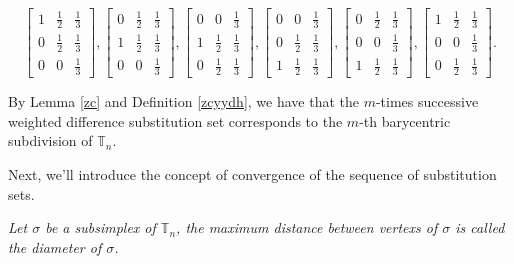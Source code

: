 \documentclass [10pt,a4paper]{article}
\begin{document}
\begin{displaymath}
\left[
\begin{array}{lll}
1 & \frac{1}{2} & \frac{1}{3} \\
0 & \frac{1}{2} & \frac{1}{3} \\
0 & 0 & \frac{1}{3}
\end{array} \right],
 \left[
\begin{array}{lll}
0 & \frac{1}{2} & \frac{1}{3} \\
1& \frac{1}{2} & \frac{1}{3} \\
0 & 0 & \frac{1}{3}
\end{array} \right],\left[
\begin{array}{lll}
0 & 0 & \frac{1}{3} \\
1 & \frac{1}{2} & \frac{1}{3} \\
0 & \frac{1}{2} & \frac{1}{3}
\end{array} \right],
\left[
\begin{array}{lll}
0 & 0 & \frac{1}{3} \\
0 & \frac{1}{2} & \frac{1}{3} \\
1 & \frac{1}{2} & \frac{1}{3}
\end{array} \right],
\left[
\begin{array}{lll}
0 & \frac{1}{2} & \frac{1}{3} \\
0 &  0 & \frac{1}{3} \\
1 & \frac{1}{2} & \frac{1}{3}
\end{array} \right],
\left[
\begin{array}{lll}
1 & \frac{1}{2} & \frac{1}{3} \\
0 & 0 & \frac{1}{3} \\
0 & \frac{1}{2} & \frac{1}{3}
\end{array} \right].
\end{displaymath}





By Lemma \ref{zc} and Def\mbox{}inition \ref{zcyydh}, we have that
the $m$-times successive weighted dif\mbox{}ference  substitution
set corresponds to the $m$-th barycentric subdivision of
$\mathbb{T}_n$.




  Next, we'll introduce the concept of
convergence of the sequence of  substitution sets.


\begin{definition}\label{sld1} \emph{ Let $\sigma$ be a subsimplex of $\mathbb{T}_n$,  the maximum distance between
 vertexs of $\sigma$
is called the diameter of $\sigma$.}
\end{definition}
\end{document}
